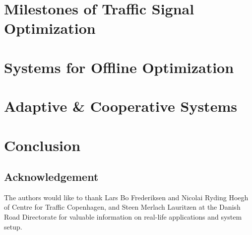 \documentclass [a4paper, 10pt]{article}
\begin{document}
%

\section{Milestones of Traffic Signal Optimization}


\section{Systems for Offline Optimization}


\section{Adaptive \& Cooperative Systems}


%

\section{Conclusion}


\subsection*{Acknowledgement} The authors would like to thank Lars Bo Frederiksen and Nicolai Ryding Hoegh of Centre for Traffic Copenhagen, and Steen Merlach
Lauritzen at the Danish Road Directorate for valuable information on
real-life applications and system setup.



\end{document}
